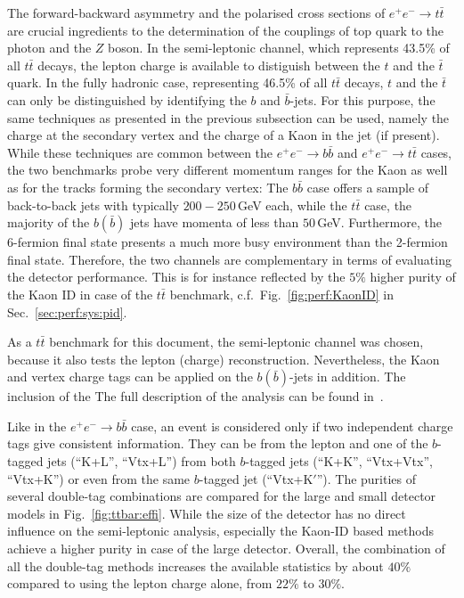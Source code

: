 The forward-backward asymmetry and the polarised cross sections of $e^+e^- \to t\bar{t}$ are crucial ingredients to the determination of the couplings of top quark to the photon and the $Z$ boson. In the semi-leptonic channel, which represents 43.5\% of all $t \bar t$ decays, the lepton charge is available to distiguish between the $t$ and the $\bar{t}$ quark. In the fully hadronic case, representing 46.5\% of all $t\bar t$ decays, $t$ and the $\bar{t}$ can only be distinguished by identifying the $b$ and $\bar{b}$-jets. For this purpose, the same techniques as presented in the previous subsection can be used, namely the charge at the secondary vertex and the charge of a Kaon in the jet (if present). While these techniques are common between the $e^+e^- \to b\bar{b}$ and $e^+e^- \to t\bar{t}$ cases, the two benchmarks probe very different momentum ranges for the Kaon as well as for the tracks forming the secondary vertex: The $b\bar{b}$ case offers a sample of back-to-back jets with typically $200-250$\,GeV each, while the $t\bar{t}$ case, the majority of the $b(\bar{b})$ jets have momenta of less than $50$\,GeV. Furthermore, the 6-fermion final state presents a much more busy environment than the 2-fermion final state.
Therefore, the two channels are complementary in terms of evaluating the detector performance. This is for instance reflected by the $5\%$ higher purity of the Kaon ID in case of the $t\bar{t}$ benchmark, c.f.\ Fig.~\ref{fig:perf:KaonID} in Sec.~\ref{sec:perf:sys:pid}.

As a $t\bar{t}$ benchmark for this document, the semi-leptonic channel was chosen, because it also tests the lepton (charge) reconstruction. Nevertheless, the Kaon and vertex charge tags can be applied on the $b(\bar{b})$-jets in addition. The inclusion of the The full description of the analysis can be found in~\cite{ILDNote:bbtt}. 

Like in the $e^+e^- \to b\bar{b}$ case, an event is considered only if two independent charge tags give consistent information. They can be from the lepton and one of the $b$-tagged jets (``K+L'', ``Vtx+L'') from both $b$-tagged jets (``K+K'', ``Vtx+Vtx'', ``Vtx+K'') or even from the same $b$-tagged jet (``Vtx+K$'$''). The purities of several double-tag combinations are compared for the large and small detector models in Fig.~\ref{fig:ttbar:effi}. While the size of the detector has no direct influence on the semi-leptonic analysis, especially the Kaon-ID based methods achieve a higher purity in case of the large detector. Overall, the combination of all the double-tag methods
increases the available statistics by about $40\%$ compared to using the lepton charge alone, from $22\%$ to $30\%$. 

